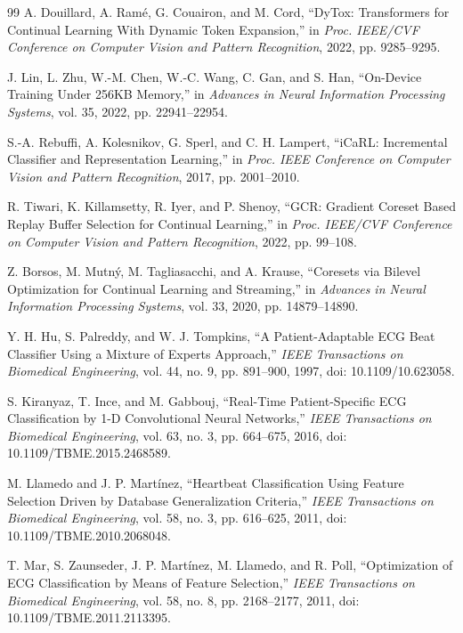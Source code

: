 \begin{thebibliography}{99}
A. Douillard, A. Ram\'e, G. Couairon, and M. Cord,
``DyTox: Transformers for Continual Learning With Dynamic Token Expansion,''
in \emph{Proc. IEEE/CVF Conference on Computer Vision and Pattern
Recognition}, 2022, pp. 9285--9295.

J. Lin, L. Zhu, W.-M. Chen, W.-C. Wang, C. Gan, and S. Han,
``On-Device Training Under 256KB Memory,''
in \emph{Advances in Neural Information Processing Systems},
vol. 35, 2022, pp. 22941--22954.

S.-A. Rebuffi, A. Kolesnikov, G. Sperl, and C. H. Lampert,
``iCaRL: Incremental Classifier and Representation Learning,''
in \emph{Proc. IEEE Conference on Computer Vision and Pattern Recognition},
2017, pp. 2001--2010.

R. Tiwari, K. Killamsetty, R. Iyer, and P. Shenoy,
``GCR: Gradient Coreset Based Replay Buffer Selection for Continual
Learning,''
in \emph{Proc. IEEE/CVF Conference on Computer Vision and Pattern
Recognition}, 2022, pp. 99--108.

Z. Borsos, M. Mutn\'y, M. Tagliasacchi, and A. Krause,
``Coresets via Bilevel Optimization for Continual Learning and Streaming,''
in \emph{Advances in Neural Information Processing Systems},
vol. 33, 2020, pp. 14879--14890.


Y. H. Hu, S. Palreddy, and W. J. Tompkins,
``A Patient-Adaptable ECG Beat Classifier Using a Mixture of Experts
Approach,''
\emph{IEEE Transactions on Biomedical Engineering},
vol. 44, no. 9, pp. 891--900, 1997,
doi: 10.1109/10.623058.

S. Kiranyaz, T. Ince, and M. Gabbouj,
``Real-Time Patient-Specific ECG Classification by 1-D Convolutional Neural
Networks,''
\emph{IEEE Transactions on Biomedical Engineering},
vol. 63, no. 3, pp. 664--675, 2016,
doi: 10.1109/TBME.2015.2468589.

M. Llamedo and J. P. Mart\'inez,
``Heartbeat Classification Using Feature Selection Driven by Database
Generalization Criteria,''
\emph{IEEE Transactions on Biomedical Engineering},
vol. 58, no. 3, pp. 616--625, 2011,
doi: 10.1109/TBME.2010.2068048.

T. Mar, S. Zaunseder, J. P. Mart\'inez, M. Llamedo, and R. Poll,
``Optimization of ECG Classification by Means of Feature Selection,''
\emph{IEEE Transactions on Biomedical Engineering},
vol. 58, no. 8, pp. 2168--2177, 2011,
doi: 10.1109/TBME.2011.2113395.


\end{thebibliography}
